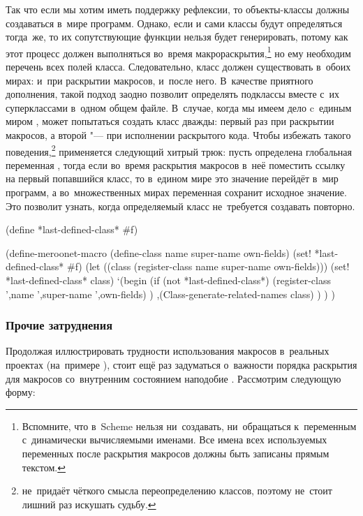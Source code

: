 Так что если мы хотим иметь поддержку рефлексии, то объекты-классы должны
создаваться в~мире программ. Однако, если и сами классы будут определяться
тогда~же, то их сопутствующие функции нельзя будет генерировать, потому как
этот процесс должен выполняться во~время макрораскрытия,\footnote*{Вспомните,
что в~Scheme нельзя ни~создавать, ни~обращаться к~переменным с~динамически
вычисляемыми именами. Все имена всех используемых переменных после раскрытия
макросов должны быть записаны прямым текстом.} но ему необходим перечень всех
полей класса. Следовательно, класс должен существовать в~обоих мирах: и~при
раскрытии макросов, и~после него. В~качестве приятного дополнения, такой подход
заодно позволит определять подклассы вместе с~их суперклассами в~одном общем
файле. В~случае, когда мы имеем дело c~единым миром
, {\Meroonet} может попытаться создать
класс дважды: первый раз при раскрытии макросов, а второй "--- при исполнении
раскрытого кода. Чтобы избежать такого поведения,\footnote*{{\Meroonet}
не~придаёт чёткого смысла переопределению классов, поэтому не~стоит лишний раз
искушать судьбу.} применяется следующий хитрый трюк: пусть определена глобальная
переменная , тогда если во~время раскрытия макросов
в~неё поместить ссылку на первый попавшийся класс, то в~едином мире это значение
перейдёт в~мир программ, а во~множественных мирах переменная сохранит исходное
значение. Это позволит узнать, когда определяемый класс не~требуется создавать
повторно.

\begin{code:lisp}
(define *last-defined-class* #f)

(define-meroonet-macro (define-class name super-name own-fields)
  (set! *last-defined-class* #f)
  (let ((class (register-class name super-name own-fields)))
    (set! *last-defined-class* class)
    `(begin
       (if (not *last-defined-class*)
         (register-class ',name ',super-name ',own-fields) )
       ,(Class-generate-related-names class) ) ) )
\end{code:lisp}


\subsubsection{Прочие затруднения}\label{objects/def-class/sssect:other}

Продолжая иллюстрировать трудности использования макросов в~реальных проектах
(на~примере {\Meroonet}), стоит ещё раз задуматься о~важности порядка раскрытия
для макросов со~внутренним состоянием наподобие . Рассмотрим
следующую форму:

